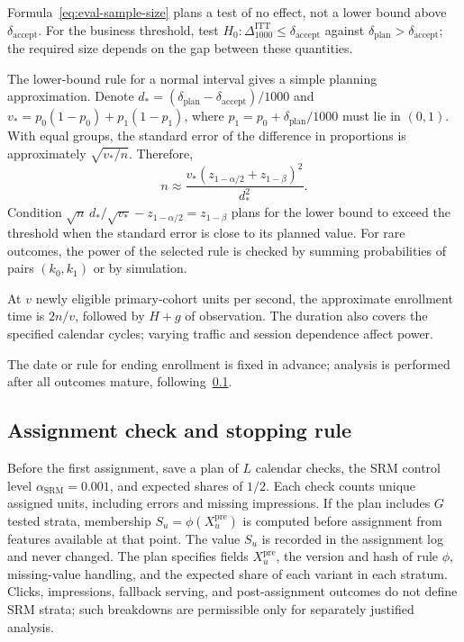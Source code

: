 \documentclass[12pt,a4paper]{article}
\theoremstyle{plainru}
\begin{document}
Formula~\eqref{eq:eval-sample-size} plans a test of no effect,
not a lower bound above $\delta_{\mathrm{accept}}$.
For the business threshold, test
$H_0:\Delta_{1000}^{\mathrm{ITT}}\le\delta_{\mathrm{accept}}$
against $\delta_{\mathrm{plan}}>\delta_{\mathrm{accept}}$;
the required size depends on the gap between these quantities.

The lower-bound rule for a normal interval gives a simple
planning approximation. Denote $d_*=(\delta_{\mathrm{plan}}-
\delta_{\mathrm{accept}})/1000$ and
$v_*=p_0(1-p_0)+p_1(1-p_1)$, where $p_1=p_0+\delta_{\mathrm{plan}}/1000$
must lie in $(0,1)$. With equal groups, the standard error
of the difference in proportions is approximately $\sqrt{v_*/n}$. Therefore,
\begin{equation}\label{eq:eval-threshold-power}
n\approx\frac{v_*(z_{1-\alpha/2}+z_{1-\beta})^2}{d_*^2}.
\end{equation}
Condition $\sqrt{n}\,d_*/\sqrt{v_*}-z_{1-\alpha/2}=z_{1-\beta}$
plans for the lower bound to exceed the threshold when the standard error
is close to its planned value. For rare outcomes, the power of the selected rule is checked
by summing probabilities of pairs $(k_0,k_1)$ or by simulation.

At $v$ newly eligible primary-cohort units per second,
the approximate enrollment time is $2n/v$,
followed by $H+g$ of observation. The duration also covers the specified
calendar cycles; varying traffic and session dependence affect power.

The date or rule for ending enrollment is fixed in advance; analysis is performed
after all outcomes mature, following~\ref{sec:eval-srm-stop}.

\subsection{Assignment check and stopping rule}
\label{sec:eval-srm-stop}

Before the first assignment, save a plan of $L$ calendar checks,
the SRM control level $\alpha_{\mathrm{SRM}}=0.001$, and expected shares of $1/2$.
Each check counts unique assigned units, including
errors and missing impressions. If the plan includes $G$ tested strata,
membership $S_u=\phi(X_u^{\mathrm{pre}})$ is computed before assignment
from features available at that point. The value $S_u$ is recorded
in the assignment log and never changed. The plan specifies fields $X_u^{\mathrm{pre}}$,
the version and hash of rule $\phi$, missing-value handling, and the expected share
of each variant in each stratum. Clicks, impressions, fallback serving,
and post-assignment outcomes do not define SRM strata; such breakdowns
are permissible only for separately justified analysis.
\end{document}
